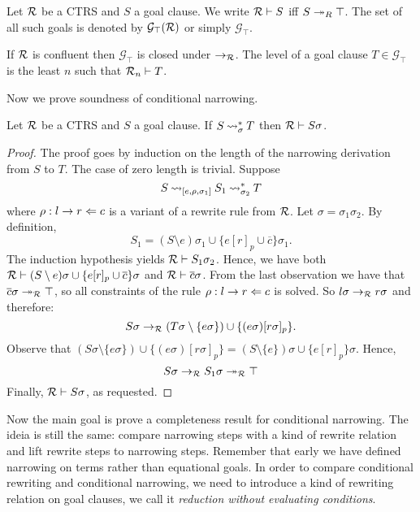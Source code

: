 \begin{definition}
	Let $\mathcal{R}$ be a CTRS and $S$ a goal clause. We write $\mathcal{R} \vdash S$ iff $S \twoheadrightarrow_R \top$. The set of all such goals is denoted by $\mathcal{G}_\top(\mathcal{R})$ or simply $\mathcal{G}_\top$.
\end{definition}

If $\mathcal{R}$ is confluent then $\mathcal{G}_\top$ is closed under $\rightarrow_{\mathcal{R}}$. The level of a goal clause $T \in \mathcal{G}_\top$ is the least $n$ such that $\mathcal{R}_n \vdash T$.

Now we prove soundness of conditional narrowing.

\begin{theorem}
	Let $\mathcal{R}$ be a CTRS and $S$ a goal clause. If $S \mathbin{\rightsquigarrow}_\sigma^* T$ then $\mathcal{R} \vdash S \sigma$.
	\begin{proof}
		The proof goes by induction on the length of the narrowing derivation from $S$ to $T$. The case of zero length is trivial. Suppose
		$$S \mathbin{\rightsquigarrow}_{[e, \rho, \sigma_1]} S_1 \mathbin{\rightsquigarrow}_{\sigma_2}^* T$$
		where $\rho : l \rightarrow r \Leftarrow c$ is a variant of a rewrite rule from $\mathcal{R}$. Let $\sigma = \sigma_1 \sigma_2$. By definition,
		$$S_1 = (S \setminus {e})\sigma_1 \cup \{ e[r]_p \cup \overline{c} \}\sigma_1.$$
		The induction hypothesis yields $\mathcal{R} \vdash S_1 \sigma_2$. Hence, we have both $\mathcal{R} \vdash (S \setminus {e}) \sigma \cup \{e[r]_p \cup \overline{c} \}\sigma$ and $\mathcal{R} \vdash \overline{c} \sigma$. From the last observation we have that $\overline{c}\sigma \twoheadrightarrow_{\mathcal{R}} \top$, so all constraints of the rule $\rho : l \rightarrow r \Leftarrow c$ is solved. So $l\sigma \rightarrow_{\mathcal{R}} r \sigma$ and therefore:
		$$S \sigma \rightarrow_{\mathcal{R}} (T \sigma \setminus \{ e\sigma \}) \cup \{ (e\sigma)[r\sigma]_p \}.$$
		Observe that $(S \sigma \setminus \{ e\sigma \}) \cup \{ (e\sigma)[r\sigma]_p \} = (S \setminus \{e\})\sigma \cup \{ e[r]_p \}\sigma$. Hence,
		$$S \sigma \rightarrow_{\mathcal{R}} S_1\sigma \twoheadrightarrow_{\mathcal{R}} \top$$
		Finally, $\mathcal{R} \vdash S \sigma$, as requested.
	\end{proof}
\end{theorem}

Now the main goal is prove a completeness result for conditional narrowing. The ideia is still the same: compare narrowing steps with a kind of rewrite relation and lift rewrite steps to narrowing steps. Remember that early we have defined narrowing on terms rather than equational goals. In order to compare conditional rewriting and conditional narrowing, we need to introduce a kind of rewriting relation on goal clauses, we call it \textit{reduction without evaluating conditions}.


